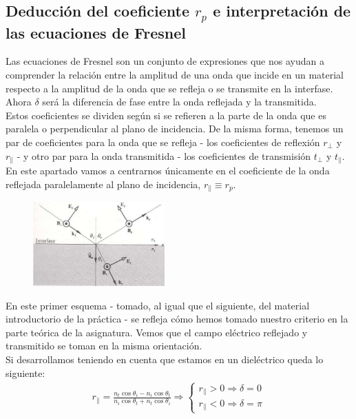 \documentclass[11pt]{article}
\begin{document}
    \subsection{Deducción del coeficiente $r_p$ e interpretación de las ecuaciones de Fresnel}
    \noindent Las ecuaciones de Fresnel son un conjunto de expresiones que nos ayudan a comprender la relación entre la amplitud de una onda que incide en un material respecto a la amplitud de la onda que se refleja o se transmite en la interfase. Ahora $\delta$ será la diferencia de fase entre la onda reflejada y la transmitida.\\

    \noindent Estos coeficientes se dividen según si se refieren a la parte de la onda que es paralela o perpendicular al plano de incidencia. De la misma forma, tenemos un par de coeficientes para la onda que se refleja - los coeficientes de reflexión $r_\perp$ y $r_\parallel$ - y otro par para la onda transmitida - los coeficientes de transmisión $t_\perp$ y $t_\parallel$. En este apartado vamos a centrarnos únicamente en el coeficiente de la onda reflejada paralelamente al plano de incidencia, $r_\parallel \equiv r_p$.\\ 

    \begin{figure}
        \vspace{-0.5cm}
        \centering
        \includegraphics[width=0.45\textwidth]{fotos/criterio_teoría.png}
    \end{figure}
    
    \noindent En este primer esquema - tomado, al igual que el siguiente, del material introductorio de la práctica - se refleja cómo hemos tomado nuestro criterio en la parte teórica de la asignatura. Vemos que el campo eléctrico reflejado y transmitido se toman en la misma orientación. \\
    
    \noindent Si desarrollamos teniendo en cuenta que estamos en un dieléctrico queda lo siguiente:
    \begin{equation}
        \begin{split} 
        r_\parallel={\frac {n_{t}\cos \theta _{i}-n_{i}\cos \theta _{t}}{n_{i}\cos \theta _{t}+n_{t}\cos \theta _{i}}}
        \Longrightarrow
        \left\{ \begin{array}{lr} r_\parallel > 0 \Longrightarrow \delta = 0\\ r_\parallel < 0 \Longrightarrow \delta = \pi \end{array} \right.     
        \end{split}
    \end{equation}\\
    
\end{document}
